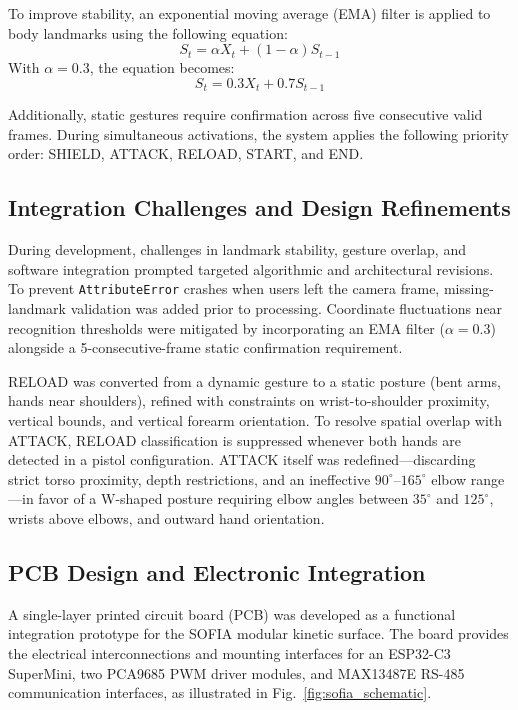 \documentclass[lettersize,journal]{IEEEtran}
\begin{document}
	To improve stability, an exponential moving average (EMA) filter is applied to body landmarks using the following equation:
	\begin{equation}
		S_t = \alpha X_t + (1 - \alpha)S_{t-1}
	\end{equation} 
	With $\alpha = 0.3$, the equation becomes:
	\begin{equation}
		S_t = 0.3X_t + 0.7S_{t-1}
	\end{equation} 
	
	Additionally, static gestures require confirmation across five consecutive valid frames. During simultaneous activations, the system applies the following priority order: SHIELD, ATTACK, RELOAD, START, and END.

	\subsection{Integration Challenges and Design Refinements}
	
	During development, challenges in landmark stability, gesture overlap, and software integration prompted targeted algorithmic and architectural revisions. To prevent \texttt{AttributeError} crashes when users left the camera frame, missing-landmark validation was added prior to processing. Coordinate fluctuations near recognition thresholds were mitigated by incorporating an EMA filter ($\alpha = 0.3$) alongside a 5-consecutive-frame static confirmation requirement.
	
	RELOAD was converted from a dynamic gesture to a static posture (bent arms, hands near shoulders), refined with constraints on wrist-to-shoulder proximity, vertical bounds, and vertical forearm orientation. 
	To resolve spatial overlap with ATTACK, RELOAD classification is suppressed whenever both hands are detected in a pistol configuration. ATTACK itself was redefined—discarding strict torso proximity, depth restrictions, and an ineffective $90^\circ$–$165^\circ$ elbow range—in favor of a W-shaped posture requiring elbow angles between $35^\circ$ and $125^\circ$, wrists above elbows, and outward hand orientation.
	
	\subsection{PCB Design and Electronic Integration}
	\label{subsec:pcb_design}
	
	A single-layer printed circuit board (PCB)
	was developed as a functional integration
	prototype for the SOFIA modular kinetic
	surface. The board provides the electrical
	interconnections and mounting interfaces
	for an ESP32-C3 SuperMini, two PCA9685
	PWM driver modules, and MAX13487E RS-485
	communication interfaces, as illustrated
	in Fig.~\ref{fig:sofia_schematic}.
	
\end{document}
